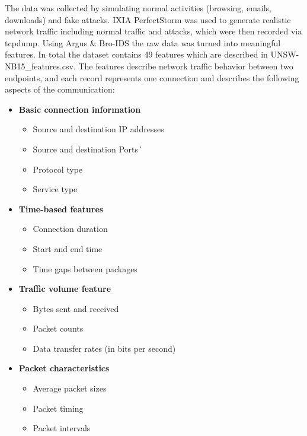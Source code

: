 \nextparagraph
The data was collected by simulating normal activities (browsing, emails, downloads) and fake attacks.  IXIA PerfectStorm was used to generate realistic network traffic including normal traffic and attacks, which were then recorded via tcpdump. Using Argus \& Bro-IDS the raw data was turned into meaningful features. In total the dataset contains 49 features which are described in UNSW-NB15\_features.csv. The features describe network traffic behavior between two endpoints, and each record represents one connection and describes the following aspects of the communication:

\begin{itemize}
    \item \textbf{Basic connection information}
    \begin{itemize}
        \item Source and destination IP addresses
        \item Source and destination Ports´
        \item Protocol type
        \item Service type
    \end{itemize}
    \newpage
    \item \textbf{Time-based features}
    \begin{itemize}
        \item Connection duration
        \item Start and end time
        \item Time gaps between packages
    \end{itemize}

    \item \textbf{Traffic volume feature}
    \begin{itemize}
        \item Bytes sent and received
        \item Packet counts
        \item Data transfer rates (in bits per second)
    \end{itemize}

    \item \textbf{Packet characteristics}
    \begin{itemize}
        \item Average packet sizes
        \item Packet timing
        \item Packet intervals
    \end{itemize}


\end{itemize}
